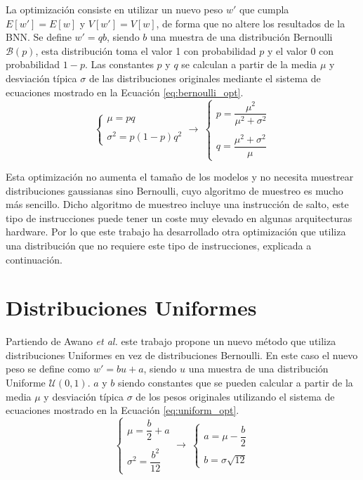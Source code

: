 La optimización consiste en utilizar un nuevo peso $w'$ que cumpla $E[w'] = E[w]$ y $V[w'] = V[w]$, de forma que no altere los resultados de la BNN. Se define $w' = qb$, siendo $b$ una muestra de una distribución Bernoulli $\mathcal{B}(p)$, esta distribución toma el valor 1 con probabilidad $p$ y el valor 0 con probabilidad $1-p$. Las constantes $p$ y $q$ se calculan a partir de la media $\mu$ y desviación típica $\sigma$ de las distribuciones originales mediante el sistema de ecuaciones mostrado en la Ecuación \ref{eq:bernoulli_opt}.
\begin{equation}\label{eq:bernoulli_opt}
\begin{cases}
\mu = pq\\ \\
\sigma^2 = p(1-p)q^2
\end{cases}
\rightarrow\ 
\begin{cases}
p = \dfrac{\mu^2}{\mu^2 + \sigma^2}\\ \\
q = \dfrac{\mu^2 + \sigma^2}{\mu}
\end{cases}
\end{equation}

Esta optimización no aumenta el tamaño de los modelos y no necesita muestrear distribuciones gaussianas sino Bernoulli, cuyo algoritmo de muestreo es mucho más sencillo. Dicho algoritmo de muestreo incluye una instrucción de salto, este tipo de instrucciones puede tener un coste muy elevado en algunas arquitecturas hardware. Por lo que este trabajo ha desarrollado otra optimización que utiliza una distribución que no requiere este tipo de instrucciones, explicada a continuación.

\section{Distribuciones Uniformes}

Partiendo de Awano \emph{et al.} este trabajo propone un nuevo método que utiliza distribuciones Uniformes en vez de distribuciones Bernoulli. En este caso el nuevo peso se define como $w' = bu + a$, siendo $u$ una muestra de una distribución Uniforme $\mathcal{U}(0,1)$. $a$ y $b$ siendo constantes que se pueden calcular a partir de la media $\mu$ y desviación típica $\sigma$ de los pesos originales utilizando el sistema de ecuaciones mostrado en la Ecuación \ref{eq:uniform_opt}.
\begin{equation}\label{eq:uniform_opt}
\begin{cases}
\mu = \dfrac{b}{2} + a\\ \\
\sigma^2 = \dfrac{b^2}{12}
\end{cases}
\rightarrow\ 
\begin{cases}
a = \mu - \dfrac{b}{2}\\ \\
b = \sigma \sqrt{12}
\end{cases}
\end{equation}

